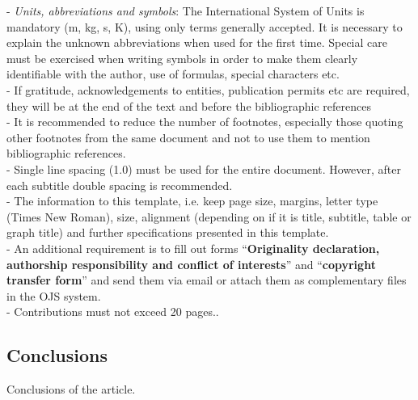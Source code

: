 \documentclass{momento}
\begin{document}
\begin{sloppypar}
- \textit{Units, abbreviations and symbols}: The International System of Units is mandatory (m, kg, s, K), using only terms generally accepted. It is necessary to explain the unknown abbreviations when used for the first time. Special care must be exercised when writing symbols in order to make them clearly identifiable with the author, use of formulas, special characters etc.\\

- If gratitude, acknowledgements to entities, publication permits etc are required, they will be at the end of the text and before the bibliographic references\\

- It is recommended to reduce the number of footnotes, especially those quoting other footnotes from the same document and not to use them to mention bibliographic references.\\

- Single line spacing (1.0) must be used for the entire document. However, after each subtitle double spacing is recommended.\\

- The information to this template, i.e. keep page size, margins, letter type (Times New Roman), size, alignment (depending on if it is title, subtitle, table or graph title) and further specifications presented in this template.\\

- An additional requirement is to fill out forms ``\textbf {Originality declaration, authorship responsibility and conflict of interests}'' and ``\textbf {copyright transfer form}'' and send them via email or attach them as complementary files in the OJS system.\\

- Contributions must not exceed 20 pages..


\subsection*{Conclusions}
Conclusions of the article.



\end{sloppypar}
\end{document}
